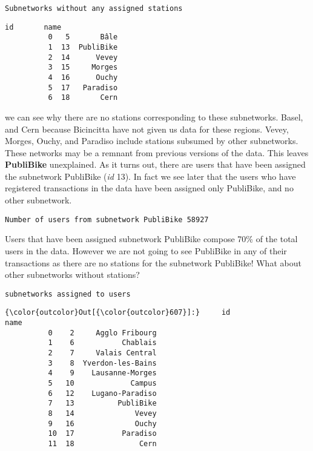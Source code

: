 \documentclass{report}
\begin{document}
    \begin{Verbatim}[commandchars=\\\{\}]
Subnetworks without any assigned stations
    \end{Verbatim}

            \begin{Verbatim}[commandchars=\\\{\}]
	     id       name
          0   5       Bâle
          1  13  PubliBike
          2  14      Vevey
          3  15     Morges
          4  16      Ouchy
          5  17   Paradiso
          6  18       Cern
\end{Verbatim}
        
    we can see why there are no stations corresponding to these subnetworks.
Basel, and Cern because Bicincitta have not given us data for these
regions. Vevey, Morges, Ouchy, and Paradiso include stations subsumed by
other subnetworks. These networks may be a remnant from previous
versions of the data. This leaves \textbf{PubliBike} unexplained. As it
turns out, there are users that have been assigned the subnetwork
PubliBike (\emph{id} 13). In fact we see later that the users who have
registered transactions in the data have been assigned only PubliBike,
and no other subnetwork.


    \begin{Verbatim}[commandchars=\\\{\}]
Number of users from subnetwork PubliBike 58927
    \end{Verbatim}

    Users that have been assigned subnetwork PubliBike compose 70\% of the
total users in the data. However we are not going to see PubliBike in
any of their transactions as there are no stations for the subnetwork
PubliBike! What about other subnetworks without stations?


    \begin{Verbatim}[commandchars=\\\{\}]
subnetworks assigned to users
    \end{Verbatim}

            \begin{Verbatim}[commandchars=\\\{\}]
{\color{outcolor}Out[{\color{outcolor}607}]:}     id               name
          0    2     Agglo Fribourg
          1    6           Chablais
          2    7     Valais Central
          3    8  Yverdon-les-Bains
          4    9    Lausanne-Morges
          5   10             Campus
          6   12    Lugano-Paradiso
          7   13          PubliBike
          8   14              Vevey
          9   16              Ouchy
          10  17           Paradiso
          11  18               Cern
\end{Verbatim}
        
\end{document}
